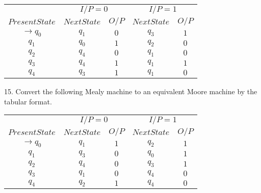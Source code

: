 \documentclass{article}
\begin{document}
\begin{center}
\begin{tabular}{ccccc}
 \hline

 \hline

 \hline

 \hline
 &  \multicolumn{2}{c}{$I/P = 0$ } &  \multicolumn{2}{c}{$I/P = 1$}  \\
  \cline{2-3}                         \cline{4-5}
 $Present State$ &   $Next State$  & $O/P$ &  $Next State$  & $O/P$\\
\hline
$\rightarrow q_0$  &  $q_1$  &  $0$  &  $q_3$  & $1$ \\
$q_1$             &  $q_0$  &  $1$  &  $q_2$  & $0$ \\
$q_2$             &  $q_4$  &  $0$  &  $q_1$  & $0$ \\
$q_3$             &  $q_4$  &  $1$  &  $q_1$  & $1$ \\
$q_4$             &  $q_3$  &  $1$  &  $q_1$  & $0$ \\
 \hline

 \hline

 \hline

 \hline
\end{tabular}
\end{center}

\vspace*{0.3cm}
15. Convert the following Mealy machine to an equivalent Moore machine by the tabular format.

\begin{center}
\begin{tabular}{ccccc}
 \hline

 \hline

 \hline

 \hline
 &  \multicolumn{2}{c}{$I/P = 0$ } &  \multicolumn{2}{c}{$I/P = 1$}  \\
  \cline{2-3}                         \cline{4-5}
 $Present State$ &   $Next State$  & $O/P$ &  $Next State$  & $O/P$\\
\hline
$\rightarrow q_0$  &  $q_1$  &  $1$  &  $q_2$  & $1$ \\
$q_1$             &  $q_3$  &  $0$  &  $q_0$  & $1$ \\
$q_2$             &  $q_4$  &  $0$  &  $q_3$  & $1$ \\
$q_3$             &  $q_1$  &  $0$  &  $q_4$  & $0$ \\
$q_4$             &  $q_2$  &  $1$  &  $q_4$  & $0$ \\
 \hline

 \hline

 \hline

 \hline
\end{tabular}
\end{center}
\end{document}
